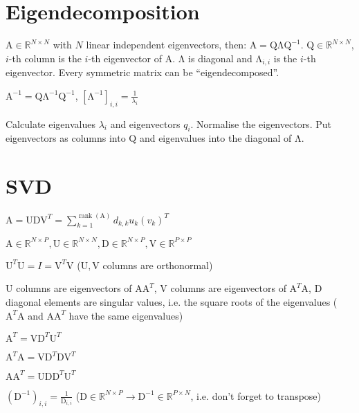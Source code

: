 \documentclass[a4paper, 11pt, landscape]{article}
\newenvironment{listcols}[1]
	{%
		\bgroup %
		\setlength{\multicolsep}{0pt} %
		\begin{multicols*}{#1} %
	}
	{%
		\end{multicols*} %
		\egroup %
	}
\newcommand{\matr}[1]{\boldsymbol{\mathrm{#1}}}
\begin{document}
\begin{multicols*}{3}
\section{Eigendecomposition}
$\matr{A} \in \mathbb{R}^{N \times N}$ with $N$ linear independent eigenvectors, then: $\matr{A} = \matr{Q \Lambda Q}^{-1}$. $\matr{Q} \in \mathbb{R}^{N \times N}$, $i$-th column is the $i$-th eigenvector of $\matr{A}$. $\matr{\Lambda}$ is diagonal and $\matr{\Lambda}_{i,i}$ is the $i$-th eigenvector. Every symmetric matrix can be ``eigendecomposed''.

$\matr{A}^{-1} = \matr{Q} \matr{\Lambda}^{-1} \matr{Q}^{-1}$, $\left[ \matr{\Lambda}^{-1} \right]_{i,i} = \frac{1}{\lambda_i}$

Calculate eigenvalues $\lambda_i$ and eigenvectors $q_i$. Normalise the eigenvectors. Put eigenvectors as columns into $\matr{Q}$ and eigenvalues into the diagonal of $\matr{\Lambda}$.

\section{SVD}
\begin{compactitem}
	\item $\matr{A} = \matr{U} \matr{D} \matr{V}^T = \sum_{k=1}^{\operatorname{rank}(\matr{A})} d_{k,k} u_k (v_k)^T$
	\item $\matr{A} \in \mathbb{R}^{N \times P}, \matr{U} \in \mathbb{R}^{N \times N}, \matr{D} \in \mathbb{R}^{N \times P}, \matr{V} \in \mathbb{R}^{P \times P}$
	\item $\matr{U}^T \matr{U} = I = \matr{V}^T \matr{V}$ ($\matr{U}, \matr{V}$ columns are orthonormal)
	\item $\matr{U}$ columns are eigenvectors of $\matr{A} \matr{A}^T$, $\matr{V}$ columns are eigenvectors of $\matr{A}^T \matr{A}$, $\matr{D}$ diagonal elements are singular values, i.e. the square roots of the eigenvalues ($\matr{A}^T \matr{A}$ and $\matr{A} \matr{A}^T$ have the same eigenvalues)
	\begin{listcols}{2}
		\item $\matr{A}^T = \matr{V} \matr{D}^T \matr{U}^T$
		\item $\matr{A}^T \matr{A} = \matr{V} \matr{D}^T \matr{D} \matr{V}^T$
		\item $\matr{A} \matr{A}^T = \matr{U} \matr{D} \matr{D}^T \matr{U}^T$
	\end{listcols}
	\item $(\matr{D}^{-1})_{i,i} = \frac{1}{\matr{D}_{i, i}}$ ($\matr{D} \in \mathbb{R}^{N \times P} \to \matr{D}^{-1} \in \mathbb{R}^{P \times N}$, i.e. don't forget to transpose)
\end{compactitem}


\end{multicols*}
\end{document}

